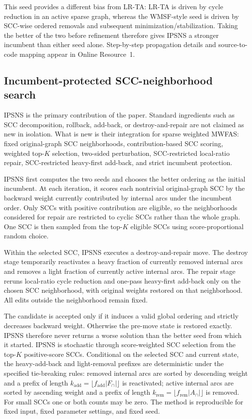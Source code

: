 This seed provides a different bias from LR-TA: LR-TA is driven by cycle reduction in an active sparse graph, whereas the WMSF-style seed is driven by SCC-wise ordered removals and subsequent minimization/stabilization. Taking the better of the two before refinement therefore gives IPSNS a stronger incumbent than either seed alone. Step-by-step propagation details and source-to-code mapping appear in Online Resource~1.

\subsection{Incumbent-protected SCC-neighborhood search}
\label{subsec:ipsns}

IPSNS is the primary contribution of the paper. Standard ingredients such as SCC decomposition, rollback, add-back, or destroy-and-repair are not claimed as new in isolation. What is new is their integration for sparse weighted MWFAS: fixed original-graph SCC neighborhoods, contribution-based SCC scoring, weighted top-\(K\) selection, two-sided perturbation, SCC-restricted local-ratio repair, SCC-restricted heavy-first add-back, and strict incumbent protection.

IPSNS first computes the two seeds and chooses the better ordering as the initial incumbent. At each iteration, it scores each nontrivial original-graph SCC by the backward weight currently contributed by internal arcs under the incumbent order. Only SCCs with positive contribution are eligible, so the neighborhoods considered for repair are restricted to cyclic SCCs rather than the whole graph. One SCC is then sampled from the top-\(K\) eligible SCCs using score-proportional random choice.

Within the selected SCC, IPSNS executes a destroy-and-repair move. The destroy stage temporarily reactivates a heavy fraction of currently removed internal arcs and removes a light fraction of currently active internal arcs. The repair stage reruns local-ratio cycle reduction and one-pass heavy-first add-back only on the chosen SCC neighborhood, with original weights restored on that neighborhood. All edits outside the neighborhood remain fixed.

The candidate is accepted only if it induces a valid global ordering and strictly decreases backward weight. Otherwise the pre-move state is restored exactly. IPSNS therefore never returns a worse solution than the better seed from which it started. IPSNS is stochastic through score-weighted SCC selection from the top-\(K\) positive-score SCCs. Conditional on the selected SCC and current state, the heavy-add-back and light-removal prefixes are deterministic under the specified tie-breaking rules: removed internal arcs are sorted by descending weight and a prefix of length \(k_{\mathrm{add}}=\lfloor f_{\mathrm{add}}|F_{\cap}|\rfloor\) is reactivated; active internal arcs are sorted by ascending weight and a prefix of length \(k_{\mathrm{rem}}=\lfloor f_{\mathrm{rem}}|A_{\cap}|\rfloor\) is removed. For small SCCs one or both counts may be zero. The method is reproducible for fixed input, fixed parameter settings, and fixed seed.

